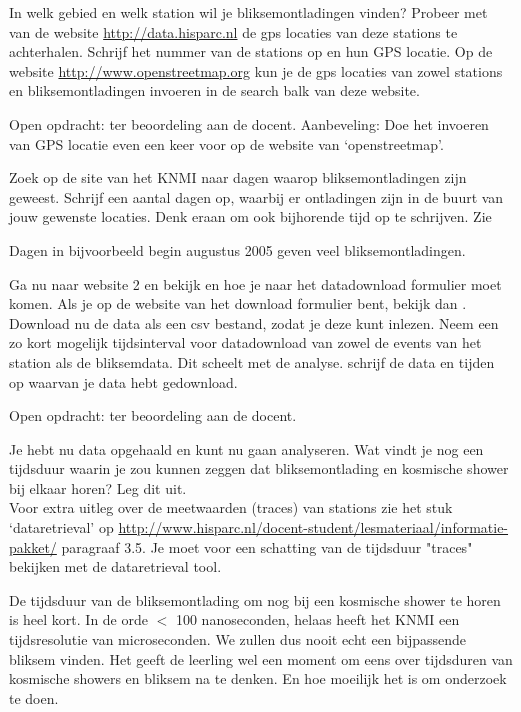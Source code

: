 \begin{questions}
\question 
In welk gebied en welk station wil je bliksemontladingen vinden? Probeer met 
van de website \url{http://data.hisparc.nl} de gps locaties van deze stations te 
achterhalen. Schrijf het nummer van de stations op en hun GPS locatie.
Op de website \url{http://www.openstreetmap.org} kun je de gps locaties van zowel
stations en bliksemontladingen invoeren in de search balk van deze website. 
\begin{solution}
    Open opdracht: ter beoordeling aan de docent. Aanbeveling: Doe het invoeren van GPS locatie
    even een keer voor op de website van `openstreetmap'.
\end{solution}

\question 
Zoek op de site van het KNMI naar dagen waarop bliksemontladingen zijn geweest.
Schrijf een aantal dagen op, waarbij er ontladingen zijn in de buurt van jouw gewenste
locaties. Denk eraan om ook bijhorende tijd op te schrijven. Zie 
\begin{solution}
    Dagen in bijvoorbeeld begin augustus 2005 geven veel bliksemontladingen.
\end{solution}

\question 
Ga nu naar website 2 en bekijk  en 
hoe je naar het datadownload formulier moet komen. 
Als je op de website van het download formulier bent, bekijk dan .
Download nu de data als een csv bestand, zodat je deze kunt inlezen. Neem een zo kort mogelijk tijdsinterval
voor datadownload van zowel de events van het \hisparc station als de bliksemdata.
Dit scheelt met de analyse. schrijf de data en tijden op waarvan je data hebt gedownload.
\begin{solution}
    Open opdracht: ter beoordeling aan de docent.
\end{solution}

\question 
Je hebt nu data opgehaald en kunt nu gaan analyseren.
Wat vindt je nog een tijdsduur waarin je zou kunnen zeggen dat bliksemontlading
en kosmische shower bij elkaar horen? Leg dit uit. \\
\small{Voor extra uitleg over de meetwaarden (traces) van \hisparc stations zie het stuk `dataretrieval' 
op \url{ http://www.hisparc.nl/docent-student/lesmateriaal/informatie-pakket/} paragraaf 3.5.
Je moet voor een schatting van de tijdsduur "traces" bekijken met de dataretrieval tool.}
\begin{solution}
    De tijdsduur van de bliksemontlading om nog bij een kosmische shower te horen 
    is heel kort. In de orde $<$ 100 nanoseconden, helaas heeft het KNMI een tijdsresolutie
    van microseconden. We zullen dus nooit echt een bijpassende bliksem vinden.
    Het geeft de leerling wel een moment om eens over tijdsduren van kosmische showers en bliksem 
    na te denken. En hoe moeilijk het is om onderzoek te doen.
\end{solution}


\end{questions}
